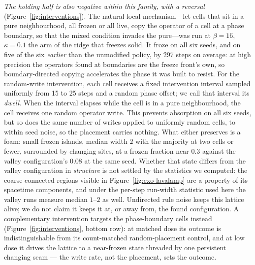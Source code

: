 \emph{The holding half is also negative within this family, with a reversal}
(Figure~\ref{fig:interventions}). The natural local mechanism---let cells that
sit in a pure neighbourhood, all frozen or all live, copy the operator of a
cell at a phase boundary, so that the mixed condition invades the pure---was
run at $\beta = 16$, $\kappa = 0.1$ the arm of the ridge that freezes solid.
It froze on all six seeds, and on five of the six \emph{earlier} than the
unmodified policy, by $297$ steps on average: at high precision the operators
found at boundaries are the freeze front's own, so boundary-directed copying
accelerates the phase it was built to resist. For the random-write intervention, each cell receives a fixed intervention interval sampled uniformly from 15 to 25 steps and a random phase offset; we call that interval its \emph{dwell}. When the interval elapses while the cell is in a pure neighbourhood, the cell receives one random operator write. This prevents absorption on all six seeds, but so does the same number of writes applied to uniformly random cells, to within seed noise, so the placement carries nothing. What either
preserves is a foam: small frozen islands, median width $2$ with the
majority at two cells or fewer, surrounded by changing sites, at a frozen
fraction near $0.3$ against the valley configuration's $0.08$ at the same
seed. Whether that state differs
from the valley configuration in \emph{structure} is not settled by the
statistics we computed: the coarse connected regions visible in
Figure~\ref{fig:exo-lavalamp} are a property of its spacetime components,
and under the per-step run-width statistic used here the valley runs measure
median $1$--$2$ as well. Undirected rule noise keeps this lattice alive; we
do not claim it keeps it at, or away from, the found configuration. A
complementary intervention targets the phase-boundary cells instead
(Figure~\ref{fig:interventions}, bottom row): at matched dose its outcome is
indistinguishable from its count-matched random-placement control, and at low dose it drives
the lattice to a near-frozen state threaded by one persistent changing seam
--- the write rate, not the placement, sets the outcome.

